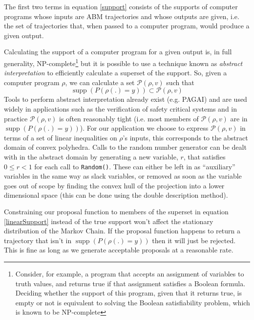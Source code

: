 \documentclass{article}
\DeclareMathOperator\supp{supp}
\begin{document}
The first two terms in equation \eqref{support} consists of the supports of computer programs whose inputs are ABM trajectories and whose outputs are given, i.e. the set of trajectories that, when passed to a computer program, would produce a given output.

Calculating the support of a computer program for a given output is, in full generality, NP-complete\footnote{Consider, for example, a program that accepts an assignment of variables to truth values, and returns true if that assignment satisfies a Boolean formula. Deciding whether the support of this program, given that it returns true, is empty or not is equivalent to solving the Boolean satisfiability problem, which is known to be NP-complete\cite{cook1971complexity}} but it is possible to use a technique known as \textit{abstract interpretation}\cite{cousot1977abstract} to efficiently calculate a superset of the support. So, given a computer program $\rho$, we can calculate a set $\mathcal{P}(\rho, v)$ such that
\[
\supp(P(\rho(.)=y)) \subset \mathcal{P}(\rho, v)
\]
Tools to perform abstract interpretation already exist (e.g. PAGAI\cite{henry2012pagai}) and are used widely in applications such as the verification of safety critical systems\cite{blanchet2003static} and in practice $\mathcal{P}(\rho, v)$ is often reasonably tight (i.e. most members of $\mathcal{P}(\rho, v)$ are in $\supp(P(\rho(.)=y))$). For our application we choose to express $\mathcal{P}(\rho, v)$ in terms of a set of linear inequalities on $\rho$'s inputs, this corresponds to the abstract domain of convex polyhedra\cite{cousot1978automatic}\cite{becchi2018efficient}. Calls to the random number generator can be dealt with in the abstract domain by generating a new variable, $r$, that satisfies $0 \le r < 1$ for each call to \texttt{Random()}. These can either be left in as ``auxiliary'' variables in the same way as slack variables, or removed as soon as the variable goes out of scope by finding the convex hull of the projection into a lower dimensional space (this can be done using the double description method\cite{motzkin1953double}).


Constraining our proposal function to members of the superset in equation \eqref{linearSupport} instead of the true support won't affect the stationary distribution of the Markov Chain. If the proposal function happens to return a trajectory that isn't in $\supp(P(\rho(.)=y))$ then it will just be rejected. This is fine as long as we generate acceptable proposals at a reasonable rate.
\end{document}

